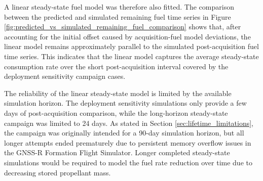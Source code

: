 A linear steady-state fuel model was therefore also fitted. The comparison between the predicted and simulated remaining fuel time series in Figure \ref{fig:predicted_vs_simulated_remaining_fuel_comparison} shows that, after accounting for the initial offset caused by acquisition-fuel model deviations, the linear model remains approximately parallel to the simulated post-acquisition fuel time series. This indicates that the linear model captures the average steady-state consumption rate over the short post-acquisition interval covered by the deployment sensitivity campaign cases.

The reliability of the linear steady-state model is limited by the available simulation horizon. The deployment sensitivity simulations only provide a few days of post-acquisition comparison, while the long-horizon steady-state campaign was limited to 24 days. As stated in Section \ref{sec:lifetime_limitations}, the campaign was originally intended for a 90-day simulation horizon, but all longer attempts ended prematurely due to persistent memory overflow issues in the GNSS-R Formation Flight Simulator. Longer completed steady-state simulations would be required to model the fuel rate reduction over time due to decreasing stored propellant mass. 

